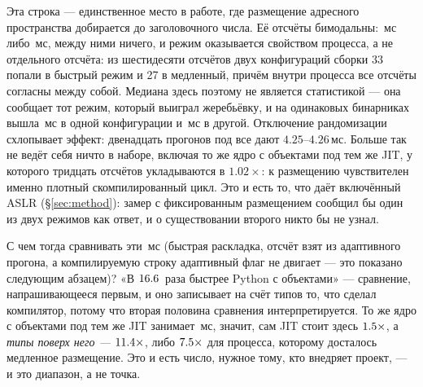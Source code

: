 Эта строка --- единственное место в работе, где размещение адресного пространства добирается до
заголовочного числа. Её отсчёты бимодальны: \,мс либо \,мс, между ними ничего, и режим
оказывается свойством процесса, а не отдельного отсчёта: из шестидесяти отсчётов двух
конфигураций сборки 33 попали в быстрый режим и 27 в медленный, причём внутри процесса все отсчёты
согласны между собой. Медиана здесь поэтому не является статистикой --- она сообщает тот режим,
который выиграл жеребьёвку, и на одинаковых бинарниках вышла \,мс в одной конфигурации и
\,мс в другой. Отключение рандомизации схлопывает эффект: двенадцать прогонов под
 все дают $4.25$--$4.26$\,мс. Больше так не ведёт себя ничто в наборе, включая то
же ядро с объектами под тем же JIT, у которого тридцать отсчётов укладываются в $1.02\times$: к
размещению чувствителен именно плотный скомпилированный цикл. Это и есть то, что даёт включённый
ASLR (\S\ref{sec:method}): замер с фиксированным размещением сообщил бы один из двух режимов как
ответ, и о существовании второго никто бы не узнал.

С чем тогда сравнивать эти \,мс (быстрая
раскладка, отсчёт взят из адаптивного прогона, а компилируемую строку адаптивный флаг не
двигает --- это показано следующим абзацем)? «В $\meas{ratio:b6_static-fork_static:matmul96_int/fork_static/boxed_python|b6_static-fork_static_adaptive:matmul96_int/fork_static_adaptive/static_jit}{16.6}$~раза быстрее Python с объектами» --- сравнение,
напрашивающееся первым, и оно записывает на счёт типов то, что сделал компилятор, потому что
вторая половина сравнения интерпретируется. То же ядро с объектами под тем же JIT занимает \,мс, значит,
сам JIT стоит здесь $\meas{ratio:b6_static-fork_static:matmul96_int/fork_static/boxed_python|b6_static-fork_static:matmul96_int/fork_static/boxed_jit}{1.5}\times$, а \emph{типы поверх него --- $\meas{ratio:b6_static-fork_static:matmul96_int/fork_static/boxed_jit|b6_static-fork_static_adaptive:matmul96_int/fork_static_adaptive/static_jit}{11.4}\times$}, либо $\meas{ratio:b6_static-fork_static:matmul96_int/fork_static/boxed_jit|b6_static-fork_static:matmul96_int/fork_static/static_jit}{7.5}\times$ для
процесса, которому досталось медленное размещение. Это и есть число, нужное тому, кто внедряет проект, --- и это
диапазон, а не точка.

